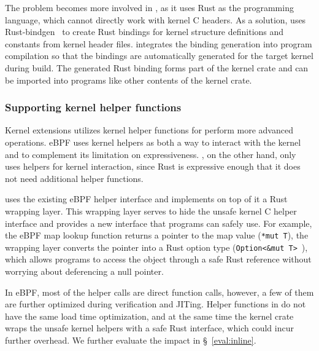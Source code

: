 The problem becomes more involved in \projname{}, as it uses Rust as the
    programming language, which cannot directly work with kernel C headers.
As a solution, \projname{} uses Rust-bindgen~\cite{bindgen} to create Rust
    bindings for kernel structure definitions and constants from kernel header
    files.
\projname{} integrates the binding generation into program compilation so that
    the bindings are automatically generated for the target kernel during
    build.
The generated Rust binding forms part of the kernel crate and can be imported
    into \projname{} programs like other contents of the kernel crate.

\subsubsection{Supporting kernel helper functions}
\label{impl:crate:symbol-resolv}
Kernel extensions utilizes kernel helper functions for perform more advanced
    operations.
eBPF uses kernel helpers as both a way to interact with the kernel and to
    complement its limitation on expressiveness.
\projname{}, on the other hand, only uses helpers for kernel interaction, since
    Rust is expressive enough that it does not need additional helper functions.

\projname{} uses the existing eBPF helper interface and implements on top of
    it a Rust wrapping layer.
This wrapping layer serves to hide the unsafe kernel C helper interface and
    provides a new interface that \projname{} programs can safely use.
For example, the eBPF map lookup function returns a pointer to the map value
    (\texttt{*mut T}), the \projname{} wrapping layer converts the pointer
    into a Rust option type (\texttt{Option<\&mut T>}~\cite{rust-option}),
    which allows \projname{} programs to access the object through a safe Rust
    reference without worrying about deferencing a null pointer.

In eBPF, most of the helper calls are direct function calls, however, a few of
    them are further optimized during verification and JITing.
Helper functions in \projname{} do not have the same load time optimization,
    and at the same time the kernel crate wraps the unsafe kernel helpers with
    a safe Rust interface, which could incur further overhead.
We further evaluate the impact in \S~\ref{eval:inline}.


